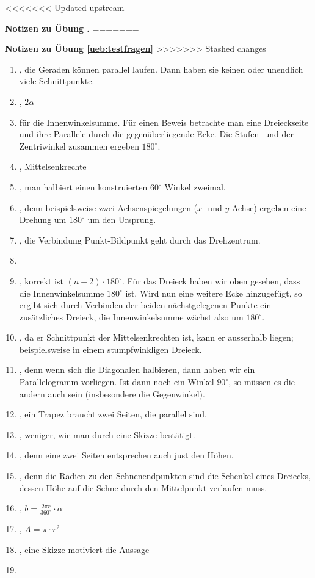 \documentclass[%
11pt,%
twoside,%
titlepage,%
swissgerman,%
headsepline%
]{scrartcl}
\newcommand{\faReturnGray}{\textcolor{gray}{\faMailReply}} %
\theoremstyle{definition}
\theoremstyle{plain}
\newcommand{\concatueb}[1]{ueb:#1}%
\newcommand{\concatlsg}[1]{lsg:#1}%
\newcounter{uebcounter}[section]
\renewcommand{\theuebcounter}{\thesection.\arabic{uebcounter}}  %
\newenvironment{lsg}[1]{%
<<<<<<< Updated upstream
    \par\noindent\textbf{Notizen zu Übung \theuebcounter\label{\concatlsg{#1}}}
=======
    \par\noindent\textbf{Notizen zu Übung \ref{\concatueb{#1}}}\label{\concatlsg{#1}}
>>>>>>> Stashed changes
    \hfill\hyperref[\concatueb{#1}]{\faReturnGray}\par %
}{%
    \par%
}
\begin{document}
\begin{lsg}{testfragen}
    \begin{enumerate}
        \item {}, die Geraden können parallel laufen. Dann haben sie keinen oder unendlich viele Schnittpunkte.
        \item {}, $2\alpha$
        \item {} für die Innenwinkelsumme. Für einen Beweis betrachte man eine Dreieckseite und ihre Parallele durch die gegenüberliegende Ecke. Die Stufen- und der Zentriwinkel zusammen ergeben $180^\circ$.
        \item {}, Mittelsenkrechte
        \item {}, man halbiert einen konstruierten $60^\circ$ Winkel zweimal.
        \item {}, denn beispielsweise zwei Achsenspiegelungen ($x$- und $y$-Achse) ergeben eine Drehung um $180^\circ$ um den Ursprung.
        \item {}, die Verbindung Punkt-Bildpunkt geht durch das Drehzentrum.
        \item {}
        \item {}, korrekt ist $(n-2)\cdot180^\circ$. Für das Dreieck haben wir oben gesehen, dass die Innenwinkelsumme $180^\circ$ ist. Wird nun eine weitere Ecke hinzugefügt, so ergibt sich durch Verbinden der beiden nächstgelegenen Punkte ein zusätzliches Dreieck, die Innenwinkelsumme wächst also um $180^\circ$.
        \item {}, da er Schnittpunkt der Mittelsenkrechten ist, kann er ausserhalb liegen; beispielsweise in einem stumpfwinkligen Dreieck.
        \item {}, denn wenn sich die Diagonalen halbieren, dann haben wir ein Parallelogramm vorliegen. Ist dann noch ein Winkel $90^\circ$, so müssen es die andern auch sein (insbesondere die Gegenwinkel).
        \item {}, ein Trapez braucht zwei Seiten, die parallel sind.
        \item {}, weniger, wie man durch eine Skizze bestätigt.
        \item {}, denn eine zwei Seiten entsprechen auch just den Höhen.
        \item {}, denn die Radien zu den Sehnenendpunkten sind die Schenkel eines Dreiecks, dessen Höhe auf die Sehne durch den Mittelpunkt verlaufen muss.
        \item {}, $b=\frac{2\pi r}{360^\circ}\cdot \alpha$
        \item {}, $A=\pi\cdot r^2$
        \item {}, eine Skizze motiviert die Aussage
        \item {}
        

\end{enumerate}
\end{lsg}
\end{document}

